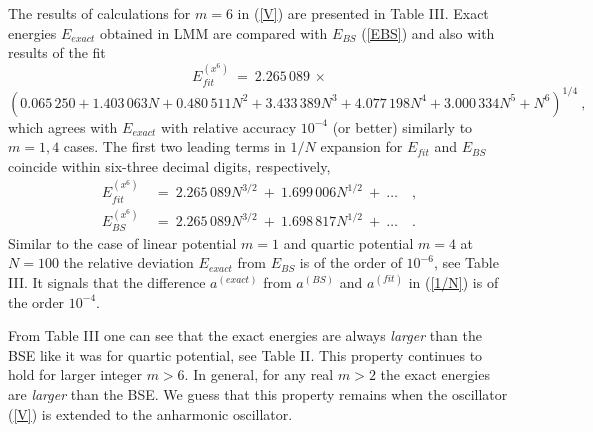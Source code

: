 \documentclass[preprint,preprintnumbers,amsmath,amssymb]{revtex4}
\begin{document}
The results of calculations for $m=6$ in (\ref{V}) are presented in Table III. Exact energies $E_{exact}$ obtained in LMM are compared with $E_{BS}$ (\ref{EBS}) and also with results of the fit
\newpage
\[
   E_{fit}^{(x^6)}\ =\ 2.265\,089\,\times
\]
\begin{equation}
	\left(0.065\,250 + 1.403\,063 N + 0.480\,511 N^2 +
                      3.433\,389 N^3 + 4.077\,198N^4+3.000\,334 N^5 + N^6\right)^{1/4}	\ ,
\end{equation}
which agrees with $E_{exact}$ with relative accuracy $10^{-4}$ (or better) similarly to $m=1,4$ cases. The first two leading terms in $1/N$ expansion for $E_{fit}$ and $E_{BS}$ coincide within six-three decimal digits, respectively,
\begin{align*}
	E_{fit}^{(x^6)}\  &=\ 2.265\,089N^{3/2}\ +\ 1.699\,006N^{1/2}\   + \ \ldots \quad ,\\
	E_{BS}^{(x^6)}\ &=\ 2.265\,089N^{3/2}\ +\  1.698\,817N^{1/2}\ + \ \ldots \quad .
\end{align*}
Similar to the case of linear potential $m=1$ and quartic potential $m=4$ at $N=100$ the relative deviation $E_{exact}$ from $E_{BS}$ is of the order of $10^{-6}$, see Table III. It signals that the difference $a^{(exact)}$ from $a^{(BS)}$ and $a^{(fit)}$ in (\ref{1/N}) is of the order $10^{-4}$.

From Table III one can see that the exact energies are always {\it larger} than the BSE like 
it was for quartic potential, see Table II. This property continues to hold for larger integer $m > 6$. In general, for any real $m > 2$ the exact energies are {\it larger} than the BSE. We guess that this property remains when the oscillator (\ref{V}) is extended to the anharmonic oscillator.
\end{document}
